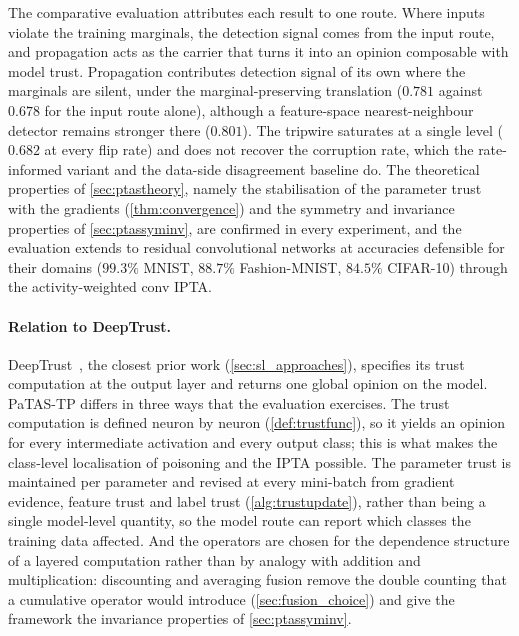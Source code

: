 The comparative evaluation attributes each result to one route. Where inputs
violate the training marginals, the detection signal comes from the input route,
and propagation acts as the carrier that turns it into an opinion composable with
model trust. Propagation contributes detection signal of its own where the
marginals are silent, under the marginal-preserving translation ($0.781$ against
$0.678$ for the input route alone), although a feature-space nearest-neighbour
detector remains stronger there ($0.801$). The tripwire saturates at a single level
($0.682$ at every flip rate) and does not recover the corruption rate, which the
rate-informed variant and the data-side disagreement baseline do. The theoretical
properties of \cref{sec:ptastheory}, namely the stabilisation of the parameter
trust with the gradients (\cref{thm:convergence}) and the symmetry and invariance
properties of \cref{sec:ptassyminv}, are confirmed in every experiment, and the
evaluation extends to residual convolutional networks at accuracies defensible for
their domains ($99.3\%$ MNIST, $88.7\%$ Fashion-MNIST, $84.5\%$ CIFAR-10) through
the activity-weighted conv \ac{IPTA}.

\paragraph*{Relation to DeepTrust.} DeepTrust~\cite{10.3389/frai.2020.00054}, the
closest prior work (\cref{sec:sl_approaches}), specifies its trust computation at
the output layer and returns one global opinion on the model. \ac{PaTAS-TP} differs
in three ways that the evaluation exercises. The trust computation is defined
neuron by neuron (\cref{def:trustfunc}), so it yields an opinion for every
intermediate activation and every output class; this is what makes the class-level
localisation of poisoning and the \ac{IPTA} possible. The parameter trust is
maintained per parameter and revised at every mini-batch from gradient evidence,
feature trust and label trust (\cref{alg:trustupdate}), rather than being a single
model-level quantity, so the model route can report which classes the training data
affected. And the operators are chosen for the dependence structure of a layered
computation rather than by analogy with addition and multiplication: discounting and
averaging fusion remove the double counting that a cumulative operator would
introduce (\cref{sec:fusion_choice}) and give the framework the invariance
properties of \cref{sec:ptassyminv}.

